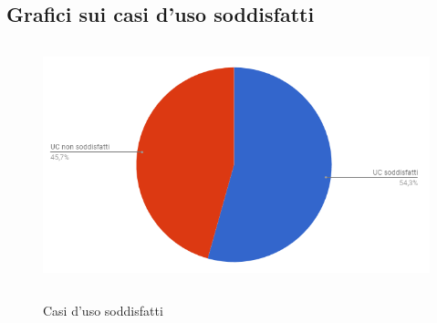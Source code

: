 \subsection{Grafici sui casi d'uso soddisfatti}
\begin{figure}[hp]
\centering
\includegraphics[height=7cm]{img/UCSoddisfatti.png}\\
\caption{Casi d'uso soddisfatti}
\end{figure}

